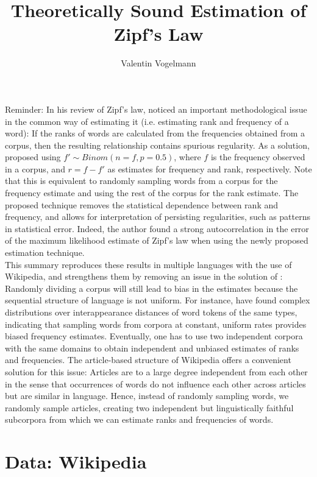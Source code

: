 \documentclass{article}
\author{Valentin Vogelmann}
\title{Theoretically Sound Estimation of Zipf's Law}
\begin{document}
\maketitle

Reminder: In his review of Zipf's law, \parencite{piantadosi2014zipf} noticed an important methodological issue in the common way of estimating it (i.e. estimating rank and frequency of a word): If the ranks of words are calculated from the frequencies obtained from a corpus, then 
the resulting relationship contains spurious regularity. As a solution, \parencite{piantadosi2014zipf} proposed using $f' \sim Binom(n=f, p=0.5)$, where $f$ is the frequency observed in a corpus, and $r = f - f'$ as estimates for frequency and rank, respectively. Note that this is equivalent to randomly sampling words from a corpus for the frequency estimate and using the rest of the corpus for the rank estimate. The proposed technique removes the statistical dependence between rank and frequency, and allows for interpretation of persisting regularities, such as patterns in statistical error. Indeed, the author found a strong autocorrelation in the error of the maximum likelihood estimate of Zipf's law when using the newly proposed estimation technique.\\

This summary reproduces these results in multiple languages with the use of Wikipedia, and strengthens them by removing an issue in the solution of \parencite{piantadosi2014zipf}: Randomly dividing a corpus will still lead to bias in the estimates because the sequential structure of language is not uniform. For instance, \parencite{corral2009universal} have found complex distributions over interappearance distances of word tokens of the same types, indicating that sampling words from corpora at constant, uniform rates provides biased frequency estimates. Eventually, one has to use two independent corpora with the same domains to obtain independent and unbiased estimates of ranks and frequencies. The article-based structure of Wikipedia offers a convenient solution for this issue: Articles are to a large degree independent from each other in the sense that occurrences of words do not influence each other across articles but are similar in language. Hence, instead of randomly sampling words, we randomly sample articles, creating two independent but linguistically faithful subcorpora from which we can estimate ranks and frequencies of words.

\section{Data: Wikipedia}
\end{document}

